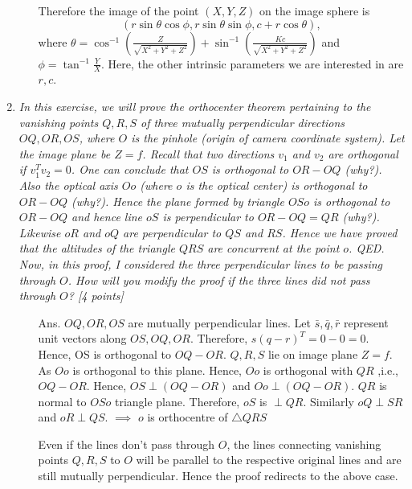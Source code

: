 \documentclass[11pt]{article}
\begin{document}
\begin{enumerate}
\begin{itemize}
Therefore the image of the point $(X,Y,Z)$ on the image sphere is 
\[
(r\sin{\theta}\cos{\phi}, r\sin{\theta}\sin{\phi}, c+r\cos{\theta}),
\]
where $\theta=\cos^{-1}(\frac{Z}{\sqrt{X^2+Y^2+Z^2}})+\sin^{-1}(\frac{Kc}{\sqrt{X^2+Y^2+Z^2}})$ and $\phi = \tan ^{-1}{\frac{Y}{X}}$. Here, the other intrinsic parameters we are interested in are $r,c$. 
	
\end{itemize}


\item \textit{In this exercise, we will prove the orthocenter theorem pertaining to the vanishing points $Q,R,S$ of three mutually perpendicular directions $OQ, OR, OS$, where $O$ is the pinhole (origin of camera coordinate system). Let the image plane be $Z = f$. Recall that two directions $v_1$ and $v_2$ are orthogonal if $v^T_1 v_2 = 0$. One can conclude that $OS$ is orthogonal to $OR-OQ$ (why?). Also the optical axis $Oo$ (where $o$ is the optical center) is orthogonal to $OR-OQ$ (why?). Hence the plane formed by triangle $OSo$ is orthogonal to $OR-OQ$ and hence line $oS$ is perpendicular to $OR-OQ = QR$ (why?). Likewise $oR$ and $oQ$ are perpendicular to $QS$ and $RS$. Hence we have proved that the altitudes of the triangle $QRS$ are concurrent at the point $o$. QED. Now, in this proof, I considered the three perpendicular lines to be passing through $O$. How will you modify the proof if the three lines did not pass through $O$? \textsf{[4 points]}}
\begin{itemize}
\item[Ans.] $OQ, OR, OS$ are mutually perpendicular lines.\newline
Let $\bar{s},\bar{q},\bar{r}$ represent unit vectors along $OS, OQ,OR$. Therefore, $s(q-r)^{T}=0-0=0$.\newline
Hence, OS is orthogonal to $OQ-OR$. $Q,R,S$ lie on image plane $Z=f$. As $Oo$ is orthogonal to this plane. Hence, $Oo$ is orthogonal with $QR$ ,i.e., $OQ-OR$.\newline
Hence, $OS\perp(OQ-OR)$ and $Oo\perp(OQ-OR)$. $QR$ is normal to $OSo$ triangle plane.\newline
Therefore, $oS$ is $\perp QR$. Similarly $oQ \perp SR$ and $oR \perp QS$. \newline
$\implies$ $o$ is orthocentre of $\triangle QRS$ 

Even if the lines don't pass through $O$, the lines connecting vanishing points $Q,R,S$ to $O$ will be parallel to the respective original lines and are still mutually perpendicular. Hence the proof redirects to the above case.    
\end{itemize}



\end{enumerate}
\end{document}
